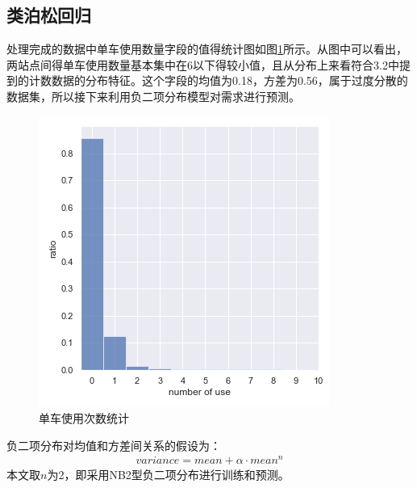 \documentclass[]{tongjithesis}
\numberwithin{equation}{chapter}
\begin{document}
\subsection{类泊松回归}
处理完成的数据中单车使用数量字段的值得统计图如图\ref{usecount}所示。从图中可以看出，两站点间得单车使用数量基本集中在6以下得较小值，且从分布上来看符合3.2中提到的计数数据的分布特征。这个字段的均值为0.18，方差为0.56，属于过度分散的数据集，所以接下来利用负二项分布模型对需求进行预测。
\begin{figure}[H]
	\centering
	\includegraphics[width= 0.5 \textwidth]{figures_main/counthist.png}
	\caption{单车使用次数统计}
	\label{usecount}
\end{figure}

负二项分布对均值和方差间关系的假设为：
\begin{align}
variance = mean + \alpha \cdot mean^{n}
\end{align}
本文取$n$为2，即采用NB2型负二项分布进行训练和预测。
\end{document}
